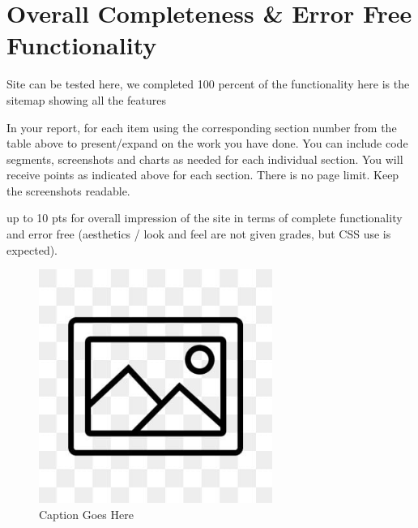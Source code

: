 \documentclass[12pt, letterpaper]{article}
\begin{document}
\newpage

\section{Overall Completeness \& Error Free Functionality}
Site can be tested here, we completed 100 percent of the functionality here is the sitemap showing all the features

In your report, for each item using the corresponding section number from the table above to present/expand on the work you have done. You can include code segments, screenshots and charts as needed for each individual section. You will receive points as indicated above for each section. There is no page limit. Keep the screenshots readable.

up to 10 pts for overall impression of the site in terms of complete functionality and error free (aesthetics / look and feel are not given grades, but CSS use is expected).

\begin{figure}[htbp]
	\centering
	\includegraphics[width=3in]{images/placeholder.jpg}
	\caption{Caption Goes Here}
 \end{figure}
\end{document}
